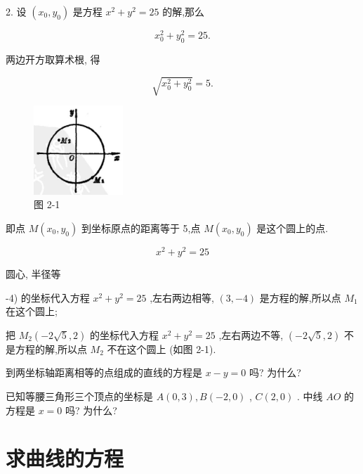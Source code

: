 \documentclass[lang=cn,newtx,10pt,scheme=chinese]{elegantbook}
\begin{document}
2. 设 \(\left( {{x}_{0},{y}_{0}}\right)\) 是方程 \({x}^{2} + {y}^{2} = {25}\) 的解,那么

\[
    {x}_{0}^{2} + {y}_{0}^{2} = {25}\text{.}
\]

两边开方取算术根, 得

\[
  \sqrt{{x}_{0}^{2} + {y}_{0}^{2}} = 5\text{.}
\]

\begin{figure}[h]
  \centering
  \includegraphics[max width=0.3\textwidth]{images/01912cc2-ffb6-728e-9ae7-b113ff05c64b_66_677276.jpg}
  \caption{图 2-1}
\end{figure}



即点 \(M\left( {{x}_{0},{y}_{0}}\right)\) 到坐标原点的距离等于 5,点 \(M\left( {{x}_{0},{y}_{0}}\right)\) 是这个圆上的点.

\[
    {x}^{2} + {y}^{2} = {25}
\]

圆心, 半径等

-4) 的坐标代入方程 \({x}^{2} + {y}^{2} = {25}\) ,左右两边相等, \(\left( {3, - 4}\right)\) 是方程的解,所以点 \({M}_{1}\) 在这个圆上;

把 \({M}_{2}\left( {-2\sqrt{5},2}\right)\) 的坐标代入方程 \({x}^{2} + {y}^{2} = {25}\) ,左右两边不等, \(\left( {-2\sqrt{5},2}\right)\) 不是方程的解,所以点 \({M}_{2}\) 不在这个圆上 (如图 2-1).

\begin{problemset}[练习]

\item 到两坐标轴距离相等的点组成的直线的方程是 \(x - y = 0\) 吗? 为什么?

\item 已知等腰三角形三个顶点的坐标是 \(A\left( {0,3}\right) ,B\left( {-2,0}\right)\) , \(C\left( {2,0}\right)\) . 中线 \({AO}\) 的方程是 \(x = 0\) 吗? 为什么?

\end{problemset}

\section{求曲线的方程}
\end{document}
